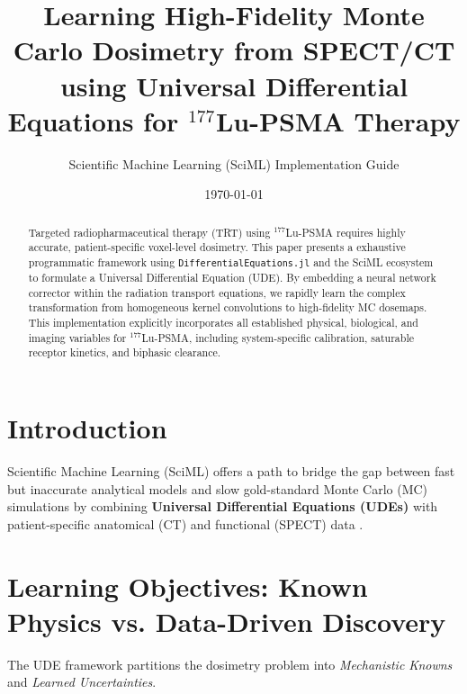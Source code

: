 \documentclass[11pt,a4paper]{article}
\title{\textbf{Learning High-Fidelity Monte Carlo Dosimetry from SPECT/CT using Universal Differential Equations for $^{177}$Lu-PSMA Therapy}}
\author{Scientific Machine Learning (SciML) Implementation Guide}
\date{\today}
\begin{document}
\maketitle

\begin{abstract}
Targeted radiopharmaceutical therapy (TRT) using $^{177}$Lu-PSMA requires highly accurate, patient-specific voxel-level dosimetry. This paper presents a exhaustive programmatic framework using \texttt{DifferentialEquations.jl} and the SciML ecosystem to formulate a Universal Differential Equation (UDE). By embedding a neural network corrector within the radiation transport equations, we rapidly learn the complex transformation from homogeneous kernel convolutions to high-fidelity MC dosemaps. This implementation explicitly incorporates all established physical, biological, and imaging variables for $^{177}$Lu-PSMA, including system-specific calibration, saturable receptor kinetics, and biphasic clearance.
\end{abstract}

\section{Introduction}
Scientific Machine Learning (SciML) offers a path to bridge the gap between fast but inaccurate analytical models and slow gold-standard Monte Carlo (MC) simulations by combining \textbf{Universal Differential Equations (UDEs)} with patient-specific anatomical (CT) and functional (SPECT) data \cite{KennedyLugassi2020}.

\section{Learning Objectives: Known Physics vs. Data-Driven Discovery}

The UDE framework partitions the dosimetry problem into \textit{Mechanistic Knowns} and \textit{Learned Uncertainties}.
\end{document}
